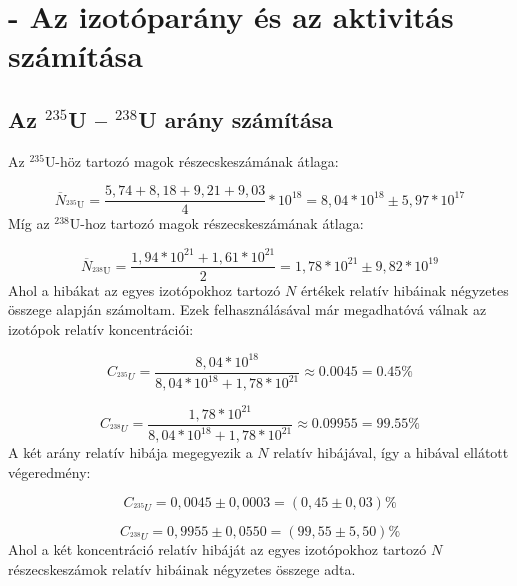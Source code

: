 \appendix
\renewcommand{\thesection}{APPENDIX \Alph{section}}
\section{ - Az izotóparány és az aktivitás számítása} \label{appendix:A}

\subsection{Az $^{235}$U -- $^{238}$U arány számítása}
Az $^{235}$U-höz tartozó magok részecskeszámának átlaga:

\begin{equation}
\overline{N}_{^{235}\text{U}}
=
\frac{5,74 + 8,18 + 9,21 + 9,03}{4} * 10^{18}
=
8,04 * 10^{18} \pm 5,97 * 10^{17}
\end{equation}
Míg az $^{238}$U-hoz tartozó magok részecskeszámának átlaga:

\begin{equation}
\overline{N}_{^{238}\text{U}}
=
\frac{1,94 * 10^{21} + 1,61 * 10^{21}}{2}
=
1,78 * 10^{21} \pm 9,82 * 10^{19}
\end{equation}
Ahol a hibákat az egyes izotópokhoz tartozó $N$ értékek relatív hibáinak négyzetes összege alapján számoltam. Ezek felhasználásával már megadhatóvá válnak az izotópok relatív koncentrációi:

\begin{equation}
C_{^{235}U}
=
\frac{8,04 * 10^{18}}{8,04 * 10^{18} + 1,78 * 10^{21}}
\approx
0.0045
=
0.45 \%
\end{equation}

\begin{equation}
C_{^{238}U}
=
\frac{1,78 * 10^{21}}{8,04 * 10^{18} + 1,78 * 10^{21}}
\approx
0.09955
=
99.55 \%
\end{equation}
A két arány relatív hibája megegyezik a $N$ relatív hibájával, így a hibával ellátott végeredmény:

\begin{equation}
C_{^{235}U}
=
0,0045 \pm 0,0003
=
\left( 0,45 \pm 0,03 \right) \%
\end{equation}

\begin{equation}
C_{^{238}U}
=
0,9955 \pm 0,0550
=
\left( 99,55 \pm 5,50 \right) \%
\end{equation}
Ahol a két koncentráció relatív hibáját az egyes izotópokhoz tartozó $N$ részecskeszámok relatív hibáinak négyzetes összege adta.

